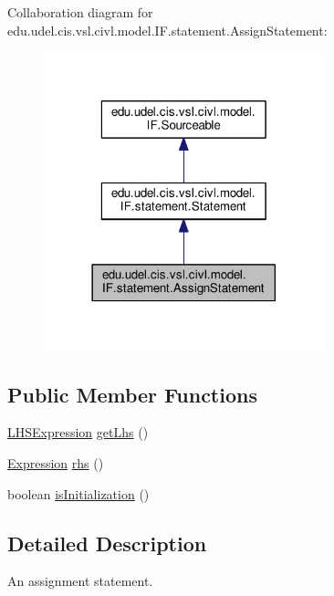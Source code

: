 Collaboration diagram for edu.\+udel.\+cis.\+vsl.\+civl.\+model.\+I\+F.\+statement.\+Assign\+Statement\+:
\nopagebreak
\begin{figure}[H]
\begin{center}
\leavevmode
\includegraphics[width=230pt]{interfaceedu_1_1udel_1_1cis_1_1vsl_1_1civl_1_1model_1_1IF_1_1statement_1_1AssignStatement__coll__graph}
\end{center}
\end{figure}
\subsection*{Public Member Functions}
\begin{DoxyCompactItemize}
\item 
\hyperlink{interfaceedu_1_1udel_1_1cis_1_1vsl_1_1civl_1_1model_1_1IF_1_1expression_1_1LHSExpression}{L\+H\+S\+Expression} \hyperlink{interfaceedu_1_1udel_1_1cis_1_1vsl_1_1civl_1_1model_1_1IF_1_1statement_1_1AssignStatement_a88e3c3ca4205389894886787d73ffd20}{get\+Lhs} ()
\item 
\hyperlink{interfaceedu_1_1udel_1_1cis_1_1vsl_1_1civl_1_1model_1_1IF_1_1expression_1_1Expression}{Expression} \hyperlink{interfaceedu_1_1udel_1_1cis_1_1vsl_1_1civl_1_1model_1_1IF_1_1statement_1_1AssignStatement_ab0fe1dd3a1ffdb010c5b1e15a506cc9f}{rhs} ()
\item 
boolean \hyperlink{interfaceedu_1_1udel_1_1cis_1_1vsl_1_1civl_1_1model_1_1IF_1_1statement_1_1AssignStatement_a5852a12058da9e10dd51d92d08e265ba}{is\+Initialization} ()
\end{DoxyCompactItemize}


\subsection{Detailed Description}
An assignment statement. 

